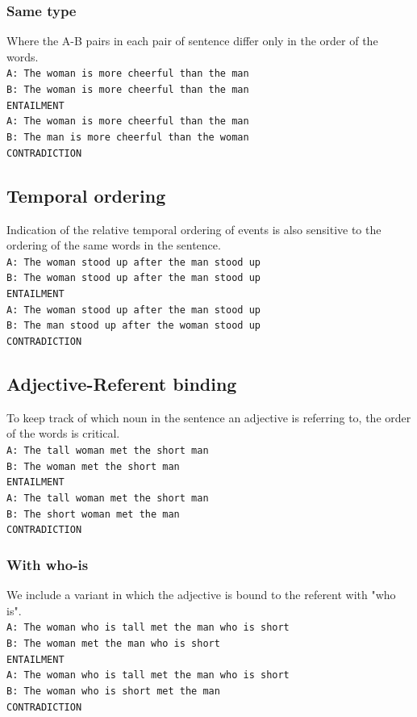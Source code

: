 \documentclass[10pt,letterpaper]{article}
\begin{document}
\subsubsection{Same type}
Where the A-B pairs in each pair of sentence differ only in the order of the words. \\
{\tt A: The woman is more cheerful than the man \\ B: The woman is more cheerful than the man\\ ENTAILMENT \\}{\tt A: The woman is more cheerful than the man \\ B: The man is more cheerful than the woman \\ CONTRADICTION } 

\subsection{Temporal ordering}

Indication of the relative temporal ordering of events is also sensitive to the ordering of the same words in the sentence.\\
{\tt  A: The woman stood up after the man stood up \\ B: The woman stood up after the man stood up \\ ENTAILMENT \\}{\tt A: The woman stood up after the man stood up \\ B: The man stood up after the woman stood up \\ CONTRADICTION}

\subsection{Adjective-Referent binding}
To keep track of which noun in the sentence an adjective is referring to, the order of the words is critical.\\
{\tt A: The tall woman met the short man \\ B: The woman met the short man \\ ENTAILMENT \\}{\tt A: The tall woman met the short man \\ B: The short woman met the man \\ CONTRADICTION}\\

\subsubsection{With who-is} 
We include a variant in which the adjective is bound to the referent with "who is". \\
{\tt A: The woman who is tall met the man who is short \\ B: The woman met the man who is short \\ ENTAILMENT \\}{\tt A: The woman who is tall met the man who is short \\ B: The woman who is short met the man\\ CONTRADICTION}
\end{document}
